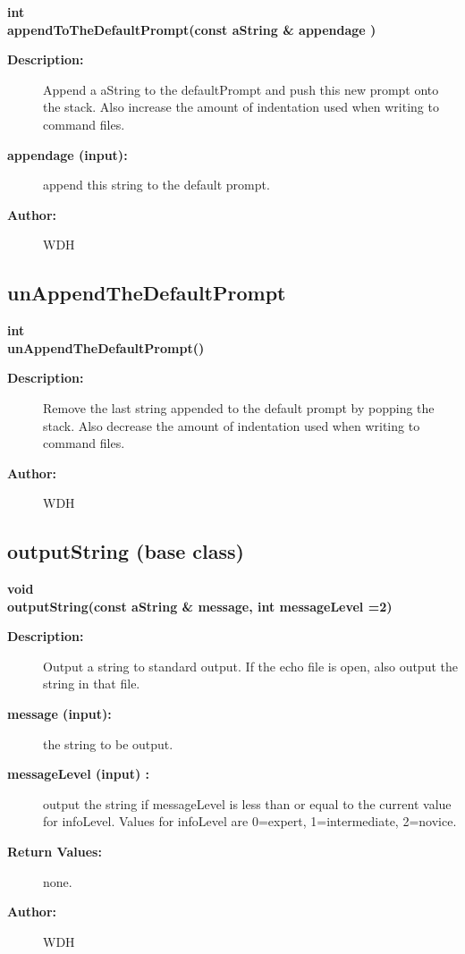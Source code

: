 \begin{flushleft} \textbf{%
int  \\ 
\settowidth{\GenericGraphicsInterfaceIncludeArgIndent}{appendToTheDefaultPrompt(}%
appendToTheDefaultPrompt(const aString \& appendage )
}\end{flushleft}
\begin{description}
\item[{\bf Description:}] 
    Append a aString to the defaultPrompt and push this new prompt onto the stack.
  Also increase the amount of indentation used when writing to command files.
\item[{\bf appendage (input):}]  append this string to the default prompt.
\item[{\bf Author:}]  WDH
\end{description}
\subsection{unAppendTheDefaultPrompt}
 
\begin{flushleft} \textbf{%
int  \\ 
\settowidth{\GenericGraphicsInterfaceIncludeArgIndent}{unAppendTheDefaultPrompt(}%
unAppendTheDefaultPrompt()
}\end{flushleft}
\begin{description}
\item[{\bf Description:}] 
   Remove the last string appended to the default prompt by popping the stack.
  Also decrease the amount of indentation used when writing to command files.
\item[{\bf Author:}]  WDH
\end{description}
\subsection{outputString (base class)}
 
\begin{flushleft} \textbf{%
void  \\ 
\settowidth{\GenericGraphicsInterfaceIncludeArgIndent}{outputString(}%
outputString(const aString \& message, int messageLevel  =2)
}\end{flushleft}
\begin{description}
\item[{\bf Description:}] 
   Output a string to standard output.
   If the echo file is open, also output the string in that file.
\item[{\bf message (input):}]  the string to be output.
\item[{\bf messageLevel (input) :}]  output the string if messageLevel is less than or equal
    to the current value for infoLevel. Values for infoLevel are 0=expert, 1=intermediate, 2=novice.
\item[{\bf Return Values:}]  none.

\item[{\bf Author:}]  WDH
\end{description}

